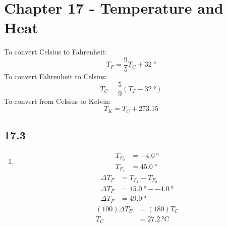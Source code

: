 \documentclass{article}
\begin{document}
\newcommand{\hr}{\par\noindent\rule{\textwidth}{0.4pt}}

\newcommand{\bc}[1]{
	\begin{equation*}
		\begin{boxed}
			{#1}
		\end{boxed}
	\end{equation*}
}

\newcommand{\cond}[2]{
	\ifmmode
		{#1} \quad {#2}
	\else
		$$ {#1} \quad {#2} $$
	\fi
}

\newcommand{\matr}[1]{
	\ifmmode \bm{#1}
	\else \textit{\textbf{#1}}
	\fi
}
\newcommand{\vect}[1]{
	\ifmmode \mathbf{#1}
	\else \textbf{#1}
	\fi
}


\tableofcontents

\section{Chapter 17 - Temperature and Heat}

To convert Celsius to Fahrenheit:
\begin{equation}
	T_F = \frac{9}{5}T_C + \SI{32}{\degree}
\end{equation}
To convert Fahrenheit to Celsius:
\begin{equation}
	T_C = \frac{5}{9}(T_F - \SI{32}{\degree})
\end{equation}
To convert from Celsius to Kelvin:
\begin{equation}
	T_K = T_C + 273.15
\end{equation}

\subsection{17.3}

\begin{enumerate}[label = \textbf{(\alph*)}]
	\item
		\begin{align*}
			T_{F_0} & = \SI{-4.0}{\degree} \\
			T_{F_1} & = \SI{45.0}{\degree}
		\end{align*}
		\begin{align*}
			\Delta T_F & = T_{F_1} - T_{F_0} \\
			\Delta T_F & = \SI{45.0}{\degree} - \SI{-4.0}{\degree} \\
			\Delta T_F & = \SI{49.0}{\degree}
		\end{align*}
		\begin{align*}
			(100)\Delta T_F & = (180)T_C \\
			T_C & = \SI{27.2}{\celsius}
		\end{align*}
\end{enumerate}
\end{document}
